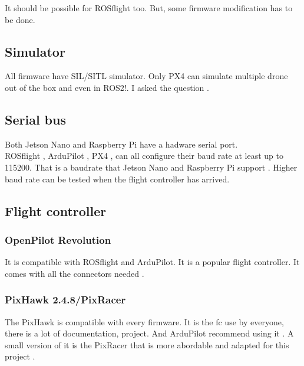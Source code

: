             It should be possible for ROSflight \cite{github_rosflight_100} too.
            But, some firmware modification has to be done.
        
        \subsection{Simulator}
            All firmware have SIL/SITL simulator.
            Only PX4 can simulate multiple drone out of the box {\color{red}and even in ROS2!}. I asked the question \cite{px4_ros2}.
            
        \subsection{Serial bus}
            Both Jetson Nano and Raspberry Pi have a hadware serial port.\\
            ROSflight \cite{rosflight_parameters},
            ArduPilot \cite{ardupilot_serial_parameters},
            PX4 \cite{px4_serial_parameters},
            can all configure their baud rate at least up to 115200. That is a baudrate that 
            Jetson Nano \cite{jetsonhacks_serial}
            and
            Raspberry Pi support \cite{rpi_stackexchange_serial}.
            Higher baud rate can be tested when the flight controller has arrived.
        
        
        
        \subsection{Flight controller}
            \subsubsection{OpenPilot Revolution}
                It is compatible with ROSflight and ArduPilot. It is a popular flight controller.
                It comes with all the connectors needed \cite{bangood_revo}.
        
        
            \subsubsection{PixHawk 2.4.8/PixRacer}
                The PixHawk is compatible with every firmware.
                It is the \gls{fc} use by everyone, there is a lot of documentation, project. And ArduPilot recommend using it \cite{ardupilot_choose_fc}.
                A small version of it is the PixRacer that is more abordable and adapted for this project \cite{mrobotics_pixracer}.
        
